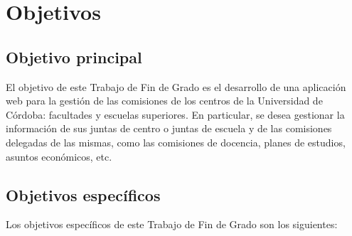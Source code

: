 \chapter{Objetivos}
\section{Objetivo principal}
 El objetivo de este Trabajo de Fin de Grado es el desarrollo de una aplicación web para la gestión de las comisiones de los centros de la Universidad de Córdoba: facultades y escuelas superiores. En particular, se desea gestionar la información de sus juntas de centro o juntas de escuela y de las comisiones delegadas de las mismas, como las comisiones de docencia, planes de estudios, asuntos económicos, etc.

\section{Objetivos específicos}

Los objetivos específicos de este Trabajo de Fin de Grado son los siguientes:

